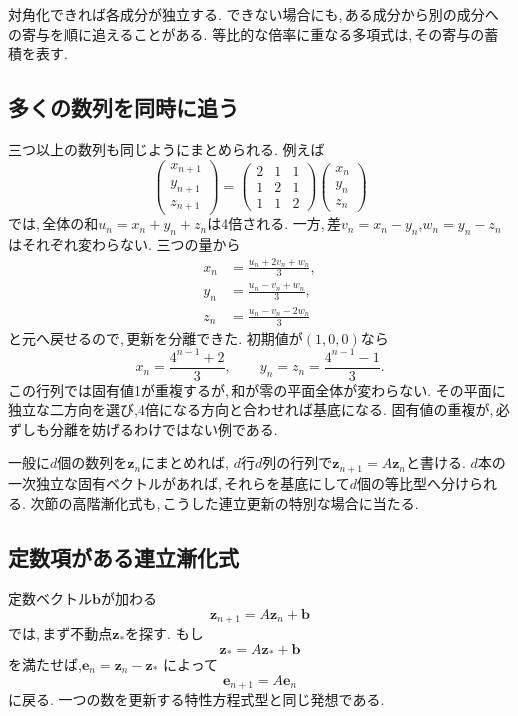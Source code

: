 \begin{bookpoint}
対角化できれば各成分が独立する.
できない場合にも,\,ある成分から別の成分への寄与を順に追えることがある.
等比的な倍率に重なる多項式は,\,その寄与の蓄積を表す.
\end{bookpoint}

\subsection{多くの数列を同時に追う}

三つ以上の数列も同じようにまとめられる.
例えば
\[
 \begin{pmatrix}x_{n+1}\\y_{n+1}\\z_{n+1}\end{pmatrix}
 =
 \begin{pmatrix}2&1&1\\1&2&1\\1&1&2\end{pmatrix}
 \begin{pmatrix}x_n\\y_n\\z_n\end{pmatrix}
\]
では,\,全体の和$u_n=x_n+y_n+z_n$は4倍される.
一方,\,差$v_n=x_n-y_n$,$w_n=y_n-z_n$はそれぞれ変わらない.
三つの量から
\[
 \begin{aligned}
 x_n&=\frac{u_n+2v_n+w_n}{3},\\
 y_n&=\frac{u_n-v_n+w_n}{3},\\
 z_n&=\frac{u_n-v_n-2w_n}{3}
 \end{aligned}
\]
と元へ戻せるので,\,更新を分離できた.
初期値が$(1,0,0)$なら
\[
 x_n=\frac{4^{n-1}+2}{3},\qquad
 y_n=z_n=\frac{4^{n-1}-1}{3}.
\]
この行列では固有値1が重複するが,\,和が零の平面全体が変わらない.
その平面に独立な二方向を選び,4倍になる方向と合わせれば基底になる.
固有値の重複が,\,必ずしも分離を妨げるわけではない例である.

一般に$d$個の数列を$\boldsymbol z_n$にまとめれば,
$d$行$d$列の行列で$\boldsymbol z_{n+1}=A\boldsymbol z_n$と書ける.
$d$本の一次独立な固有ベクトルがあれば,\,それらを基底にして$d$個の等比型へ分けられる.
次節の高階漸化式も,\,こうした連立更新の特別な場合に当たる.

\subsection{定数項がある連立漸化式}

定数ベクトル$\boldsymbol b$が加わる
\[
 \boldsymbol z_{n+1}=A\boldsymbol z_n+\boldsymbol b
\]
では,\,まず不動点$\boldsymbol z_*$を探す.
もし
\[
 \boldsymbol z_*=A\boldsymbol z_*+\boldsymbol b
\]
を満たせば,$\boldsymbol e_n=\boldsymbol z_n-\boldsymbol z_*$
によって
\[
 \boldsymbol e_{n+1}=A\boldsymbol e_n
\]
に戻る. 一つの数を更新する特性方程式型と同じ発想である.

